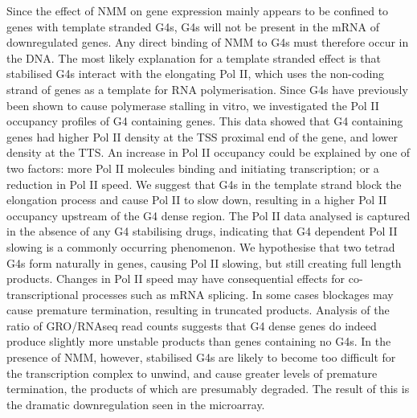 \documentclass[12pt,a4paper,]{report}
\begin{document}
Since the effect of NMM on gene expression mainly appears to be confined
to genes with template stranded G4s, G4s will not be present in the mRNA
of downregulated genes. Any direct binding of NMM to G4s must therefore
occur in the DNA. The most likely explanation for a template stranded
effect is that stabilised G4s interact with the elongating Pol II, which
uses the non-coding strand of genes as a template for RNA
polymerisation. Since G4s have previously been shown to cause polymerase
stalling in vitro, we investigated the Pol II occupancy profiles of G4
containing genes. This data showed that G4 containing genes had higher
Pol II density at the TSS proximal end of the gene, and lower density at
the TTS. An increase in Pol II occupancy could be explained by one of
two factors: more Pol II molecules binding and initiating transcription;
or a reduction in Pol II speed. We suggest that G4s in the template
strand block the elongation process and cause Pol II to slow down,
resulting in a higher Pol II occupancy upstream of the G4 dense region.
The Pol II data analysed is captured in the absence of any G4
stabilising drugs, indicating that G4 dependent Pol II slowing is a
commonly occurring phenomenon. We hypothesise that two tetrad G4s form
naturally in genes, causing Pol II slowing, but still creating full
length products. Changes in Pol II speed may have consequential effects
for co-transcriptional processes such as mRNA splicing. In some cases
blockages may cause premature termination, resulting in truncated
products. Analysis of the ratio of GRO/RNAseq read counts suggests that
G4 dense genes do indeed produce slightly more unstable products than
genes containing no G4s. In the presence of NMM, however, stabilised G4s
are likely to become too difficult for the transcription complex to
unwind, and cause greater levels of premature termination, the products
of which are presumably degraded. The result of this is the dramatic
downregulation seen in the microarray.
\end{document}
